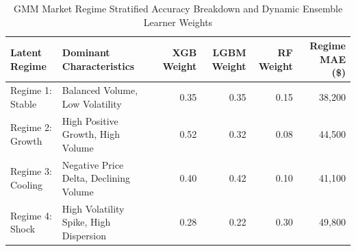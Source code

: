 \begin{table}[htbp]
\centering
\caption{GMM Market Regime Stratified Accuracy Breakdown and Dynamic Ensemble Learner Weights}
\label{tab:regime_breakdown}
\begin{tabular}{llrrrr}
\toprule
\textbf{Latent Regime} & \textbf{Dominant Characteristics} & \textbf{XGB Weight} & \textbf{LGBM Weight} & \textbf{RF Weight} & \textbf{Regime MAE (\$)} \\
\midrule
Regime 1: Stable & Balanced Volume, Low Volatility & 0.35 & 0.35 & 0.15 & 38,200 \\
Regime 2: Growth & High Positive Growth, High Volume & 0.52 & 0.32 & 0.08 & 44,500 \\
Regime 3: Cooling & Negative Price Delta, Declining Volume & 0.40 & 0.42 & 0.10 & 41,100 \\
Regime 4: Shock & High Volatility Spike, High Dispersion & 0.28 & 0.22 & 0.30 & 49,800 \\
\bottomrule
\end{tabular}
\end{table}
